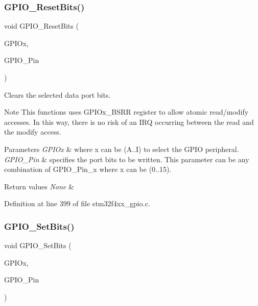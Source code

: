 \subsubsection{\texorpdfstring{G\+P\+I\+O\+\_\+\+Reset\+Bits()}{GPIO\_ResetBits()}}
{\footnotesize\ttfamily void G\+P\+I\+O\+\_\+\+Reset\+Bits (\begin{DoxyParamCaption}\item[{\hyperlink{struct_g_p_i_o___type_def}{G\+P\+I\+O\+\_\+\+Type\+Def} $\ast$}]{G\+P\+I\+Ox,  }\item[{uint16\+\_\+t}]{G\+P\+I\+O\+\_\+\+Pin }\end{DoxyParamCaption})}



Clears the selected data port bits. 

\begin{DoxyNote}{Note}
This functions uses G\+P\+I\+Ox\+\_\+\+B\+S\+RR register to allow atomic read/modify accesses. In this way, there is no risk of an I\+RQ occurring between the read and the modify access. 
\end{DoxyNote}

\begin{DoxyParams}{Parameters}
{\em G\+P\+I\+Ox} & where x can be (A..I) to select the G\+P\+IO peripheral. \\
\hline
{\em G\+P\+I\+O\+\_\+\+Pin} & specifies the port bits to be written. This parameter can be any combination of G\+P\+I\+O\+\_\+\+Pin\+\_\+x where x can be (0..15). \\
\hline
\end{DoxyParams}

\begin{DoxyRetVals}{Return values}
{\em None} & \\
\hline
\end{DoxyRetVals}


Definition at line 399 of file stm32f4xx\+\_\+gpio.\+c.

\mbox{\label{group___g_p_i_o___group2_ga9e1352eed7c6620e18af2d86f6b6ff8e}} 
\subsubsection{\texorpdfstring{G\+P\+I\+O\+\_\+\+Set\+Bits()}{GPIO\_SetBits()}}
{\footnotesize\ttfamily void G\+P\+I\+O\+\_\+\+Set\+Bits (\begin{DoxyParamCaption}\item[{\hyperlink{struct_g_p_i_o___type_def}{G\+P\+I\+O\+\_\+\+Type\+Def} $\ast$}]{G\+P\+I\+Ox,  }\item[{uint16\+\_\+t}]{G\+P\+I\+O\+\_\+\+Pin }\end{DoxyParamCaption})}




